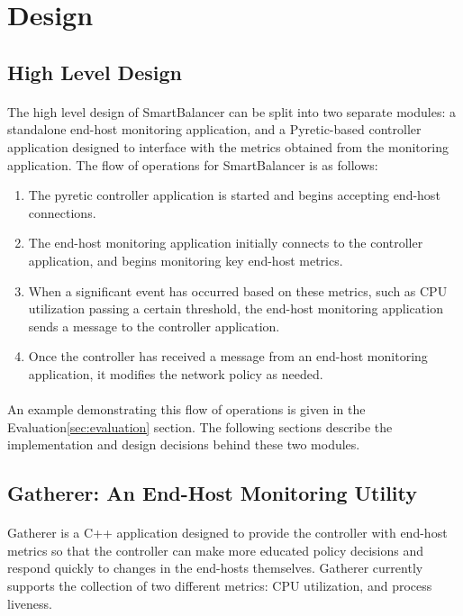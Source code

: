\documentclass[10pt]{article}
\begin{document}
\section{Design}
\label{sec:design}

\subsection{High Level Design}

\paragraph{} The high level design of SmartBalancer can be split into two separate modules: a standalone end-host monitoring application, and a Pyretic-based controller application designed to interface with the metrics obtained from the monitoring application.  The flow of operations for SmartBalancer is as follows:
\begin{enumerate}
\item The pyretic controller application is started and begins accepting end-host connections.
\item The end-host monitoring application initially connects to the controller application, and begins monitoring key end-host metrics.
\item When a significant event has occurred based on these metrics, such as CPU utilization passing a certain threshold, the end-host monitoring application sends a message to the controller application.
\item Once the controller has received a message from an end-host monitoring application, it modifies the network policy as needed.
\end{enumerate}

\paragraph{} An example demonstrating this flow of operations is given in the Evaluation\ref{sec:evaluation} section. The following sections describe the implementation and design decisions behind these two modules.

\subsection{Gatherer: An End-Host Monitoring Utility}

\paragraph{} Gatherer is a C++ application designed to provide the controller with end-host metrics so that the controller can make more educated policy decisions and respond quickly to changes in the end-hosts themselves. Gatherer currently supports the collection of two different metrics: CPU utilization, and process liveness.
\end{document}

